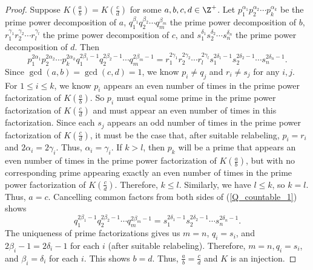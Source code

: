 \begin{proof}
Suppose $K\left( \frac{a}{b} \right) = K\left( \frac{c}{d} \right)$ for some $a,b,c,d \in \Z^+$. Let $p_1^{\alpha_1} p_2^{\alpha_2} \cdots p_k^{\alpha_k}$ be the prime power decomposition of $a$, $q_1^{\beta_1} q_2^{\beta_2} \cdots q_m^{\beta_m}$ the prime power decomposition of $b$, $r_1^{\gamma_1} r_2^{\gamma_2} \cdots r_l^{\gamma_l}$ the prime power decomposition of $c$, and $s_1^{\delta_1} s_2^{\delta_2} \cdots s_n^{\delta_n}$ the prime power decomposition of $d$. Then 
\begin{equation} \label{Q_countable_1}
p_1^{2\alpha_1} p_2^{2\alpha_2} \cdots p_k^{2\alpha_k} q_1^{2\beta_1-1} q_2^{2\beta_2-1} \cdots q_m^{2\beta_m-1} = r_1^{2\gamma_1} r_2^{2\gamma_2} \cdots r_l^{2\gamma_l} s_1^{2\delta_1-1} s_2^{2\delta_2-1} \cdots s_n^{2\delta_n-1}.
\end{equation}
Since $\gcd(a,b) = \gcd(c,d)=1$, we know $p_i \neq q_j$ and $r_i \neq s_j$ for any $i,j$. For $1 \leq i \leq k$, we know $p_i$ appears an even number of times in the prime power factorization of $K\left( \frac{a}{b} \right)$. So $p_i$ must equal some prime in the prime power factorization of $K\left( \frac{c}{d} \right)$ and must appear an even number of times in this factorization. Since each $s_j$ appears an odd number of times in the prime power factorization of $K\left( \frac{c}{d} \right)$, it must be the case that, after suitable relabeling, $p_i = r_i$ and $2\alpha_i = 2\gamma_i$. Thus, $\alpha_i = \gamma_i$. If $k > l$, then $p_k$ will be a prime that appears an even number of times in the prime power factorization of $K\left( \frac{a}{b} \right)$, but with no corresponding prime appearing exactly an even number of times in the prime power factorization of $K\left( \frac{c}{d} \right)$. Therefore, $k \leq l$. Similarly, we have $l \leq k$, so $k=l$. Thus, $a = c$. Cancelling common factors from both sides of (\ref{Q_countable_1}) shows 
\begin{equation} \label{Q_countable_2}
q_1^{2\beta_1-1} q_2^{2\beta_2-1} \cdots q_m^{2\beta_m-1} = s_1^{2\delta_1-1} s_2^{2\delta_2-1} \cdots s_n^{2\delta_n-1}.
\end{equation}
The uniqueness of prime factorizations gives us $m=n$, $q_i=s_i$, and $2\beta_i-1 = 2\delta_i-1$ for each $i$ (after suitable relabeling). Therefore, $m=n, q_i=s_i$, and $\beta_i=\delta_i$ for each $i$. This shows $b=d$. Thus, $\frac{a}{b} = \frac{c}{d}$ and $K$ is an injection.


\end{proof}
